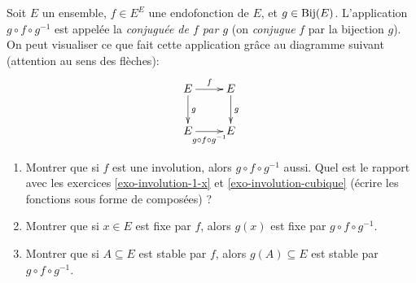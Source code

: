 \begin{exercice}
\label{exo-conjugaison}
Soit $E$ un ensemble, $f \in E^E$ une endofonction de $E$, et $g \in \operatorname{Bij}(E)$. L'application $g\circ f \circ g^{-1}$ est appelée la \emph{conjuguée de $f$ par $g$} (on \emph{conjugue} $f$ par la bijection $g$). On peut visualiser ce que fait cette application grâce au diagramme suivant (attention au sens des flèches):
\[\xymatrix{
E \ar[d]^g \ar[r]^f & E \ar[d]^g\\
E \ar[r]_{g\circ f\circ g^{-1}}& E
}\]
\begin{enumerate}
\item Montrer que si $f$ est une involution, alors $g\circ f \circ g^{-1}$ aussi. Quel est le rapport avec les exercices \ref{exo-involution-1-x} et \ref{exo-involution-cubique} (écrire les fonctions sous forme de composées) ?
\item Montrer que si $x\in E$ est fixe par $f$, alors $g(x)$ est fixe par $g\circ f \circ g^{-1}$.
\item Montrer que si $A \subseteq E$ est stable par $f$, alors $g(A) \subseteq E$ est stable par $g\circ f \circ g^{-1}$.
\end{enumerate}
\end{exercice}



